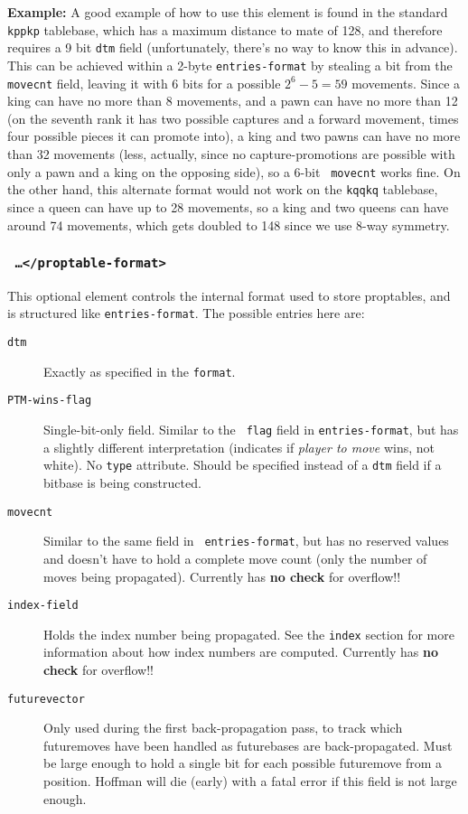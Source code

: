 \documentclass[11pt]{article}
\begin{document}
{\bf Example:} A good example of how to use this element is found in
the standard {\tt kppkp} tablebase, which has a maximum distance to
mate of 128, and therefore requires a 9 bit {\tt dtm} field
(unfortunately, there's no way to know this in advance).  This can be
achieved within a 2-byte {\tt entries-format} by stealing a bit from
the {\tt movecnt} field, leaving it with 6 bits for a possible $2^6 -
5 = 59$ movements.  Since a king can have no more than 8 movements,
and a pawn can have no more than 12 (on the seventh rank it has two
possible captures and a forward movement, times four possible pieces
it can promote into), a king and two pawns can have no more than 32
movements (less, actually, since no capture-promotions are possible
with only a pawn and a king on the opposing side), so a 6-bit {\tt
movecnt} works fine.  On the other hand, this alternate format would
not work on the {\tt kqqkq} tablebase, since a queen can have up to 28
movements, so a king and two queens can have around 74 movements, which
gets doubled to 148 since we use 8-way symmetry.


\subsubsection{\tt <proptable-format> \ldots\quad </proptable-format>}

This optional element controls the internal format used to store
proptables, and is structured like {\tt entries-format}.
The possible entries here are:

\begin{description}

\item[{\tt dtm}] Exactly as specified in the {\tt format}.

\item[{\tt PTM-wins-flag}] Single-bit-only field.  Similar to the {\tt
flag} field in {\tt entries-format}, but has a slightly different
interpretation (indicates if {\it player to move} wins, not white).
No {\tt type} attribute.  Should be specified instead of a {\tt dtm}
field if a bitbase is being constructed.

\item[{\tt movecnt}] Similar to the same field in {\tt
entries-format}, but has no reserved values and doesn't have to hold a
complete move count (only the number of moves being propagated).
Currently has {\bf no check} for overflow!!

\item[{\tt index-field}] Holds the index number being propagated.
See the {\tt index} section for more information about how
index numbers are computed.
Currently has {\bf no check} for overflow!!

\item[{\tt futurevector}] Only used during the first back-propagation
pass, to track which futuremoves have been handled as futurebases are
back-propagated.  Must be large enough to hold a single bit for each
possible futuremove from a position.  Hoffman will die (early) with a
fatal error if this field is not large enough.

\end{description}
\end{document}
